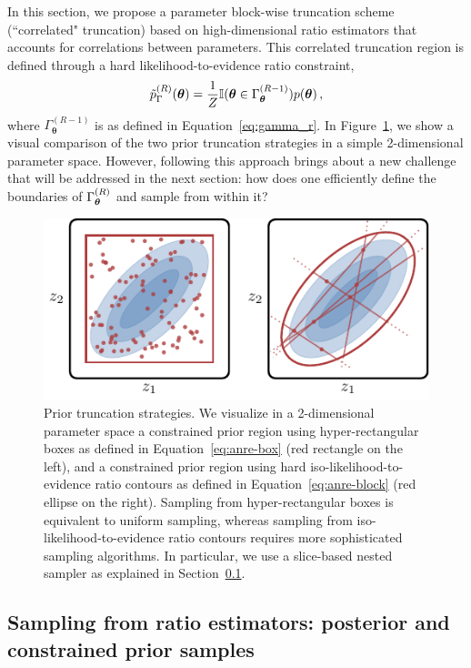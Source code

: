 In this section, we propose a parameter block-wise truncation scheme (``correlated" truncation) based on high-dimensional ratio estimators that accounts for correlations between parameters. This correlated truncation region is defined through a hard likelihood-to-evidence ratio constraint,
\begin{equation} \label{eq:anre-block}
    \tilde p^{(R)}_{\Gamma}(\bm{\theta}) = \frac1Z \mathbb{I}(\bm{\theta} \in \Gamma_{\bm{\theta}}^{(R-1)}) p(\bm{\theta}) \,,
\end{equation}
where $\Gamma_{\boldsymbol{\theta}}^{(R - 1)}$ is as defined in Equation~\eqref{eq:gamma_r}. In Figure~\ref{fig:anre-ns}, we show a visual comparison of the two prior truncation strategies in a simple 2-dimensional parameter space. However, following this approach brings about a new challenge that will be addressed in the next section: how does one efficiently define the boundaries of $\Gamma_{\bm{\theta}}^{(R)}$ and sample from within it?

\begin{figure}[h]
	\centering
	\includegraphics[width=0.8\linewidth]{TikZ/truncation_ns.pdf}
	\caption{Prior truncation strategies. We visualize in a 2-dimensional parameter space a constrained prior region using hyper-rectangular boxes as defined in Equation~\eqref{eq:anre-box} (red rectangle on the left), and a constrained prior region using hard iso-likelihood-to-evidence ratio contours as defined in Equation~\eqref{eq:anre-block} (red ellipse on the right). Sampling from hyper-rectangular boxes is equivalent to uniform sampling, whereas sampling from iso-likelihood-to-evidence ratio contours requires more sophisticated sampling algorithms. In particular, we use a slice-based nested sampler as explained in Section~\ref{subsec:anre-ns}. 
}
\label{fig:anre-ns}
\end{figure}


\subsection{Sampling from ratio estimators: posterior and constrained prior samples} \label{subsec:anre-ns}

